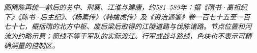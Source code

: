 \begin{center}

\smallskip
\small\textit{图\quad 隋陈再统一前后的关中、荆襄、江淮与建康，约581--589年：据《隋书·高祖纪下》《陈书·后主纪》、〈杨素传〉〈韩擒虎传〉及《资治通鉴》卷一百七十五至一百七十七，概括隋的北方中枢、废后梁后取得的江陵道路与伐陈诸路。节点位置和河流为约略示意；箭线不等于军队的实际渡江、行军或战斗路线，色块也不表示可精确测量的控制区。}
\end{center}

\label{fig:sui-chen-reunification}
